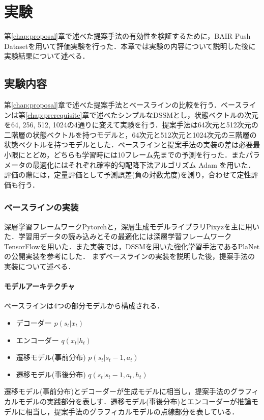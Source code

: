 \chapter{実験}
\label{chap:experiment}
第\ref{chap:proposal}章で述べた提案手法の有効性を検証するために，BAIR Push Dataset\cite{ebert2017selfsupervised}を用いて評価実験を行った．本章では実験の内容について説明した後に実験結果について述べる．

\section{実験内容}
第\ref{chap:proposal}章で述べた提案手法とベースラインの比較を行う．ベースラインは第\ref{chap:prerequisite}章で述べたシンプルなDSSMとし，状態ベクトルの次元を64, 256, 512, 1024の4通りに変えて実験を行う．提案手法は64次元と512次元の二階層の状態ベクトルを持つモデルと，64次元と512次元と1024次元の三階層の状態ベクトルを持つモデルとした．ベースラインと提案手法の実装の差は必要最小限にとどめ，どちらも学習時には10フレーム先までの予測を行った．またパラメータの最適化にはそれぞれ確率的勾配降下法アルゴリズム Adam\cite{kingma2014adam} を用いた．評価の際には，定量評価として予測誤差(負の対数尤度)を測り，合わせて定性評価も行う．

\subsection{ベースラインの実装}
深層学習フレームワークPytorch\cite{pytorch}と，深層生成モデルライブラリPixyz\cite{pixyz}を主に用いた．学習用データの読み込みとその最適化には深層学習フレームワークTensorFlow\cite{tensorflow}を用いた．また実装では，DSSMを用いた強化学習手法であるPlaNetの公開実装\cite{planet}を参考にした．
まずベースラインの実装を説明した後，提案手法の実装について述べる．

\subsubsection{モデルアーキテクチャ}
ベースラインは4つの部分モデルから構成される．
\begin{itemize}
    \item デコーダー $p(s_t|x_t)$
    \item エンコーダー $q(x_t|h_t)$
    \item 遷移モデル(事前分布) $p(s_t|s_t-1, a_t)$
    \item 遷移モデル(事後分布) $q(s_t|s_t-1, a_t, h_t)$
\end{itemize}

遷移モデル(事前分布)とデコーダーが生成モデルに相当し，提案手法のグラフィカルモデルの実践部分を表しす．遷移モデル(事後分布)とエンコーダーが推論モデルに相当し，提案手法のグラフィカルモデルの点線部分を表している．

